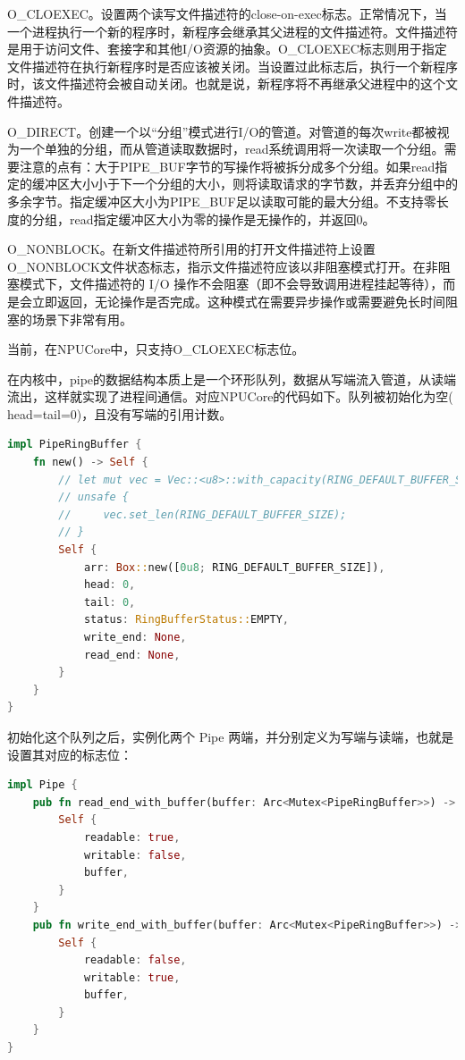 O_CLOEXEC。设置两个读写文件描述符的close-on-exec标志。正常情况下，当一个进程执行一个新的程序时，新程序会继承其父进程的文件描述符。文件描述符是用于访问文件、套接字和其他I/O资源的抽象。O_CLOEXEC标志则用于指定文件描述符在执行新程序时是否应该被关闭。当设置过此标志后，执行一个新程序时，该文件描述符会被自动关闭。也就是说，新程序将不再继承父进程中的这个文件描述符。
              
O_DIRECT。创建一个以“分组”模式进行I/O的管道。对管道的每次write都被视为一个单独的分组，而从管道读取数据时，read系统调用将一次读取一个分组。需要注意的点有：大于PIPE_BUF字节的写操作将被拆分成多个分组。如果read指定的缓冲区大小小于下一个分组的大小，则将读取请求的字节数，并丢弃分组中的多余字节。指定缓冲区大小为PIPE_BUF足以读取可能的最大分组。不支持零长度的分组，read指定缓冲区大小为零的操作是无操作的，并返回0。

O_NONBLOCK。在新文件描述符所引用的打开文件描述符上设置O_NONBLOCK文件状态标志，指示文件描述符应该以非阻塞模式打开。在非阻塞模式下，文件描述符的 I/O 操作不会阻塞（即不会导致调用进程挂起等待），而是会立即返回，无论操作是否完成。这种模式在需要异步操作或需要避免长时间阻塞的场景下非常有用。

当前，在NPUCore中，只支持O_CLOEXEC标志位。

在内核中，pipe的数据结构本质上是一个环形队列，数据从写端流入管道，从读端流出，这样就实现了进程间通信。对应NPUCore的代码如下。队列被初始化为空( head=tail=0)，且没有写端的引⽤计数。
\begin{lstlisting}[language=rust]
    impl PipeRingBuffer {
    fn new() -> Self {
        // let mut vec = Vec::<u8>::with_capacity(RING_DEFAULT_BUFFER_SIZE);
        // unsafe {
        //     vec.set_len(RING_DEFAULT_BUFFER_SIZE);
        // }
        Self {
            arr: Box::new([0u8; RING_DEFAULT_BUFFER_SIZE]),
            head: 0,
            tail: 0,
            status: RingBufferStatus::EMPTY,
            write_end: None,
            read_end: None,
        }
    }
}
\end{lstlisting}

初始化这个队列之后，实例化两个 Pipe 两端，并分别定义为写端与读端，也就是设置其对应的标志位：
\begin{lstlisting}[language=rust]
    impl Pipe {
    pub fn read_end_with_buffer(buffer: Arc<Mutex<PipeRingBuffer>>) -> Self {
        Self {
            readable: true,
            writable: false,
            buffer,
        }
    }
    pub fn write_end_with_buffer(buffer: Arc<Mutex<PipeRingBuffer>>) -> Self {
        Self {
            readable: false,
            writable: true,
            buffer,
        }
    }
}
\end{lstlisting}

